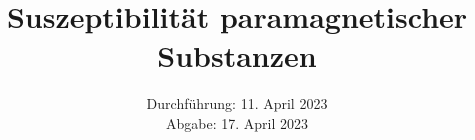 

\subject{\texorpdfstring{\vspace{2ex}}{}V606\texorpdfstring{\vspace{-2ex}}{}} %
\title{Suszeptibilität paramagnetischer Substanzen} %
\date{
	Durchführung: 11. April 2023 %
	\\ Abgabe: 17. April 2023 %
}




\maketitle
\thispagestyle{empty}


\tableofcontents
\newpage







\printbibliography{}

\newpage



